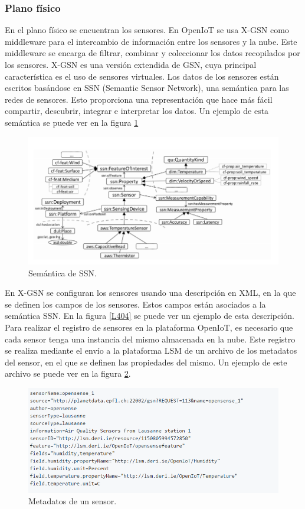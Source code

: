 \documentclass[12pt, twoside]{book}
\begin{document}
\subsubsection*{Plano físico}
En el plano físico se encuentran los sensores. En OpenIoT se usa X-GSN como middleware para el intercambio de información entre los sensores y la nube. Este middleware se encarga de filtrar, combinar y coleccionar los datos recopilados por los sensores. X-GSN es una versión extendida de GSN, cuya principal característica es el uso de sensores virtuales. Los datos de los sensores están escritos basándose en SSN (Semantic Sensor Network), una semántica para las redes de sensores. Esto proporciona una representación que hace más fácil compartir, descubrir, integrar e interpretar los datos. Un ejemplo de esta semántica se puede ver en la figura \ref{L401} \\
\begin{figure}[H]
\centering
\includegraphics[scale=0.4]{images/ssn_capture}
\caption{Semántica de SSN.}\label{L401}
\end{figure}
En X-GSN se configuran los sensores usando una descripción en XML, en la que se definen los campos de los sensores. Estos campos están asociados a la semántica SSN. En la figura \ref{L404} se puede ver un ejemplo de esta descripción. \\
Para realizar el registro de sensores en la plataforma OpenIoT, es necesario que cada sensor tenga una instancia del mismo almacenada en la nube. Este registro se realiza mediante el envío a la plataforma LSM de un archivo de los metadatos del sensor, en el que se definen las propiedades del mismo. Un ejemplo de este archivo se puede ver en la figura \ref{L402}.
\begin{figure}[H]
\centering
\includegraphics[scale=0.4]{images/metadata_capture}
\caption{Metadatos de un sensor.}\label{L402}
\end{figure}
\end{document}

